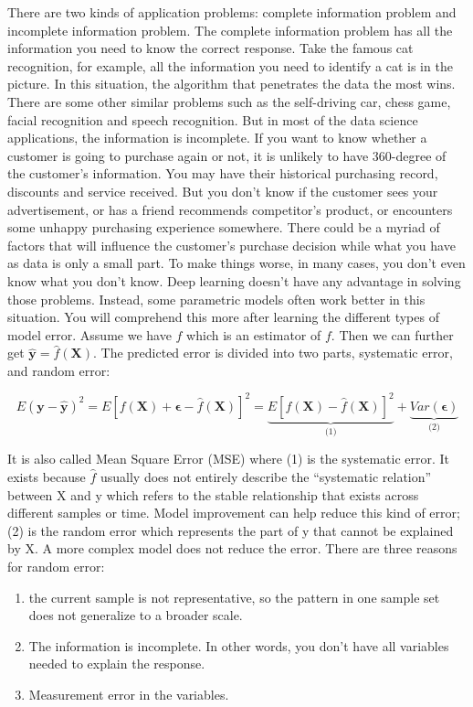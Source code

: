 \documentclass[12pt,]{krantz}
\providecommand{\tightlist}{%
  \setlength{\itemsep}{0pt}\setlength{\parskip}{0pt}}
\theoremstyle{definition}
\theoremstyle{definition}
\theoremstyle{definition}
\theoremstyle{remark}
\begin{document}
There are two kinds of application problems: complete information
problem and incomplete information problem. The complete information
problem has all the information you need to know the correct response.
Take the famous cat recognition, for example, all the information you
need to identify a cat is in the picture. In this situation, the
algorithm that penetrates the data the most wins. There are some other
similar problems such as the self-driving car, chess game, facial
recognition and speech recognition. But in most of the data science
applications, the information is incomplete. If you want to know whether
a customer is going to purchase again or not, it is unlikely to have
360-degree of the customer's information. You may have their historical
purchasing record, discounts and service received. But you don't know if
the customer sees your advertisement, or has a friend recommends
competitor's product, or encounters some unhappy purchasing experience
somewhere. There could be a myriad of factors that will influence the
customer's purchase decision while what you have as data is only a small
part. To make things worse, in many cases, you don't even know what you
don't know. Deep learning doesn't have any advantage in solving those
problems. Instead, some parametric models often work better in this
situation. You will comprehend this more after learning the different
types of model error. Assume we have \(\hat{f}\) which is an estimator
of \(f\). Then we can further get
\(\mathbf{\hat{y}}=\hat{f}(\mathbf{X})\). The predicted error is divided
into two parts, systematic error, and random error:

\[E(\mathbf{y}-\hat{\mathbf{y}})^{2}=E[f(\mathbf{X})+\mathbf{\epsilon}-\hat{f}(\mathbf{X})]^{2}=\underset{\text{(1)}}{\underbrace{E[f(\mathbf{X})-\hat{f}(\mathbf{X})]^{2}}}+\underset{\text{(2)}}{\underbrace{Var(\mathbf{\epsilon})}}
\label{eq:error}\]

It is also called Mean Square Error (MSE) where (1) is the systematic
error. It exists because \(\hat{f}\) usually does not entirely describe
the ``systematic relation'' between X and y which refers to the stable
relationship that exists across different samples or time. Model
improvement can help reduce this kind of error; (2) is the random error
which represents the part of y that cannot be explained by X. A more
complex model does not reduce the error. There are three reasons for
random error:

\begin{enumerate}
\def\labelenumi{\arabic{enumi}.}
\tightlist
\item
  the current sample is not representative, so the pattern in one sample
  set does not generalize to a broader scale.
\item
  The information is incomplete. In other words, you don't have all
  variables needed to explain the response.
\item
  Measurement error in the variables.
\end{enumerate}
\end{document}
